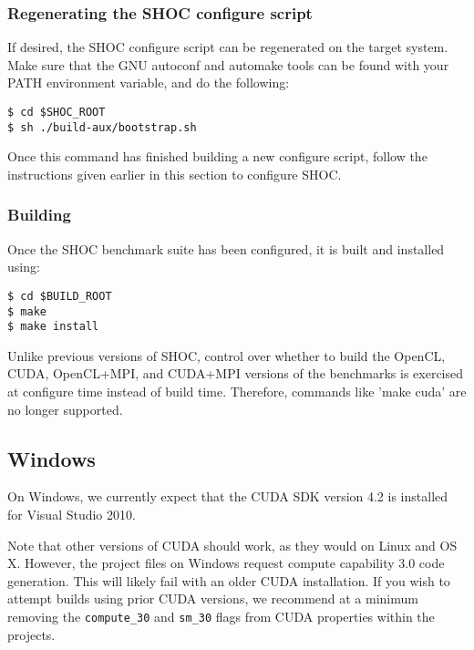 \documentclass[11pt]{article}
\begin{document}
\subsubsection{Regenerating the SHOC configure script}

If desired, the SHOC configure script can be regenerated on the target system.
Make sure that the GNU autoconf and automake tools can be found with
your PATH environment variable, and do the following:

\begin{Verbatim}[frame=single]
$ cd $SHOC_ROOT
$ sh ./build-aux/bootstrap.sh
\end{Verbatim}

Once this command has finished building a new configure script, follow the
instructions given earlier in this section to configure SHOC.

\subsubsection{Building}\label{sec:building}

Once the SHOC benchmark suite has been configured, it is built and 
installed using:

\begin{Verbatim}[frame=single]
$ cd $BUILD_ROOT
$ make
$ make install
\end{Verbatim}

Unlike previous versions of SHOC, control over whether to build the 
OpenCL, CUDA, OpenCL+MPI, and CUDA+MPI versions of the benchmarks is
exercised at configure time instead of build time.
Therefore, commands like 'make cuda' are no longer supported.

\subsection{Windows}\label{sec:windows}

On Windows, we currently expect that the CUDA SDK version 4.2
is installed for Visual Studio 2010.

Note that other versions
of CUDA should work, as they would on Linux and OS X.
However, the project files on Windows request compute capability 3.0
code generation.  This will likely fail with an older
CUDA installation.  If you wish to attempt builds using
prior CUDA versions, we recommend at a minimum
removing the \verb+compute_30+ and \verb+sm_30+ flags from CUDA properties
within the projects.
\end{document}
